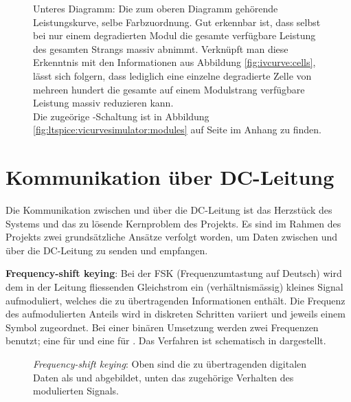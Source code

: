 \begin{figure}[h!tb]
{       Unteres Diagramm: Die  zum oberen Diagramm  geh\"orende Leistungskurve,
       selbe  Farbzuordnung. Gut  erkennbar ist,  dass  selbst  bei nur  einem
       degradierten  Modul  die  gesamte verf\"ugbare  Leistung  des  gesamten
       Strangs  massiv  abnimmt. Verkn\"upft  man  diese  Erkenntnis  mit  den
       Informationen  aus  Abbildung   \ref{fig:ivcurve:cells},  l\"asst  sich
       folgern,  dass lediglich  eine einzelne  degradierte Zelle  von mehreen
       hundert die gesamte auf  einem Modulstrang verf\"ugbare Leistung massiv
       reduzieren kann.\protect\\
       Die       zuge\"orige       -Schaltung       ist       in
       Abbildung    \ref{fig:ltspice:vicurvesimulator:modules}    auf    Seite
       \pageref{fig:ltspice:vicurvesimulator:modules} im Anhang zu finden.%
   }
   \label{fig:ivcurve:modules}
\end{figure}

\clearpage
\section{Kommunikation \"uber DC-Leitung}
\label{sec:commDCLine}

Die Kommunikation zwischen  \Sensor und \Master \"uber die  DC-Leitung ist das
Herzst\"uck des Systems und das zu l\"osende Kernproblem des Projekts. Es sind
im Rahmen  des Projekts  zwei grunds\"atzliche  Ans\"atze verfolgt  worden, um
Daten  zwischen  \Sensor und  \Master  \"uber  die  DC-Leitung zu  senden  und
empfangen.

\textbf{Frequency-shift keying}: Bei  der FSK (Frequenzumtastung  auf Deutsch)
wird  dem in  der Leitung  fliessenden Gleichstrom  ein (verh\"altnism\"assig)
kleines  Signal aufmoduliert,  welches  die  zu \"ubertragenden  Informationen
enth\"alt. Die  Frequenz   des  aufmodulierten   Anteils  wird   in  diskreten
Schritten variiert  und jeweils  einem Symbol zugeordnet. Bei  einer bin\"aren
Umsetzung  werden  zwei  Frequenzen  benutzt; eine  f\"ur    und  eine
f\"ur  .   Das  Verfahren ist  schematisch  in  
dargestellt.

\begin{figure}[h!tb]
    \centering
    
    \caption{%
        \emph{Frequency-shift  keying}: Oben   sind  die   zu  \"ubertragenden
        digitalen  Daten  als    und   abgebildet,  unten  das
        zugeh\"orige Verhalten des  modulierten Signals.%
    }
    \label{fig:fsk:concept}
\end{figure}


